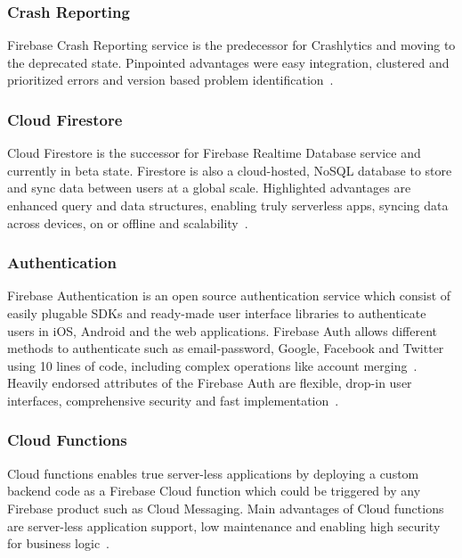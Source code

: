 \subsubsection{Crash Reporting} Firebase Crash Reporting service is
the predecessor for Crashlytics and moving to the deprecated
state. Pinpointed advantages were easy integration, clustered and
prioritized errors and version based problem
identification~\cite{hid-sp18-409-www-firebase-products}.

\subsubsection{Cloud Firestore} Cloud Firestore is the successor for
Firebase Realtime Database service and currently in beta
state. Firestore is also a cloud-hosted, NoSQL database to store and
sync data between users at a global scale. Highlighted advantages are
enhanced query and data structures, enabling truly serverless apps,
syncing data across devices, on or offline and
scalability~\cite{hid-sp18-409-www-firebase-official,
  hid-sp18-409-www-firebase-products}.

\subsubsection{Authentication} Firebase Authentication is an open
source authentication service which consist of easily plugable SDKs
and ready-made user interface libraries to authenticate users in iOS,
Android and the web applications. Firebase Auth allows different
methods to authenticate such as email-password, Google, Facebook and
Twitter using 10 lines of code, including complex operations like
account merging~\cite{hid-sp18-409-www-firebase-products}. Heavily
endorsed attributes of the Firebase Auth are flexible, drop-in user
interfaces, comprehensive security and fast
implementation~\cite{hid-sp18-409-www-firebase-wikipedia}.

\subsubsection{Cloud Functions} Cloud functions enables true
server-less applications by deploying a custom backend code as a
Firebase Cloud function which could be triggered by any Firebase
product such as Cloud Messaging. Main advantages of Cloud functions
are server-less application support, low maintenance and enabling high
security for business logic~\cite{hid-sp18-409-www-firebase-products}.

